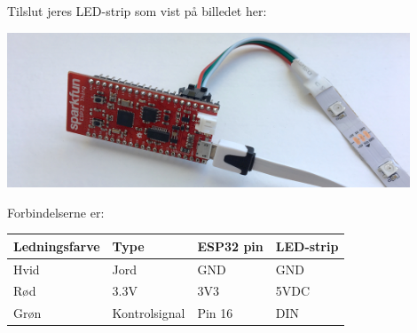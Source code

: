 \documentclass{ucph-handout}
\begin{document}
\begin{exercisebox}[adjusted title=Tilslut LED-strip]
Tilslut jeres LED-strip som vist på billedet her:
\begin{center}\includegraphics[width=0.9\textwidth]{illustrations/ledstrip-connection}
\end{center}

Forbindelserne er:
\begin{center}
\begin{tabular}{llll}
  \textbf{Ledningsfarve} & \textbf{Type} & \textbf{ESP32 pin} & \textbf{LED-strip} \\
  \hline
 Hvid & Jord & GND & GND \\
 Rød & 3.3V & 3V3 & 5VDC \\
 Grøn & Kontrolsignal & Pin 16 & DIN
\end{tabular}
\end{center}
\end{exercisebox}
\end{document}
